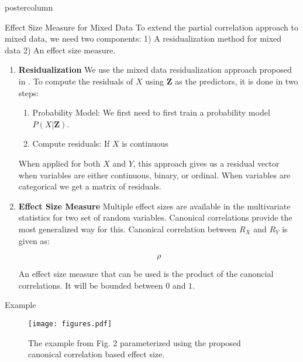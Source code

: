 \documentclass{beamer}
\newlength{\columnheight}
\begin{document}
\begin{frame}
\begin{columns}

	\begin{column}{.33\textwidth}
		\begin{beamercolorbox}[center]{postercolumn}
			\begin{minipage}{.98\textwidth} %
				\parbox[t][\columnheight]{\textwidth}{ %
	\begin{myblock}{Effect Size Measure for Mixed Data}
		To extend the partial correlation approach to mixed data, we need two components: 1) A residualization method for mixed data 2) An effect size
		measure.
		\begin{enumerate}

			\item \textbf{Residualization}
				We use the mixed data residualization approach proposed in \citet{Ankan2023}. To compute the residuals of $ X $ using $ \bm{Z} $ as the predictors, it is done in two steps:
		\begin{enumerate}
			\item Probability Model: We first need to first train a probability model $ P(X | \bm{Z}) $.
			\item Compute residuals: 
				If $ X $ is continuous 
		\end{enumerate}

		When applied for both $ X $ and $ Y $, this approach gives us a
		residual vector when variables are either continuous, binary,
		or ordinal. When variables are categorical we get a matrix of
		residuals.
		
		\item \textbf{Effect Size Measure}
			Multiple effect sizes are available in the multivariate statistics for two set of random variables. Canonical 
			correlations provide the most generalized way for this. Canonical correlation between $ R_X $ and $ R_Y $ is given
			as:

			$$ \rho $$

			An effect size measure that can be used is the product of the canoncial correlations. It will be bounded between $ 0 $ and $ 1 $.
		\end{enumerate}
	\end{myblock}\vfill
	\begin{myblock}{Example}
		\begin{figure}
			\texttt{[image: figures.pdf]}
			\caption{The example from Fig. 2 parameterized using the proposed canonical correlation based effect size.}
		\end{figure}
	\end{myblock}
		}\end{minipage}\end{beamercolorbox}
	\end{column}



\end{columns}
\end{frame}
\end{document}
